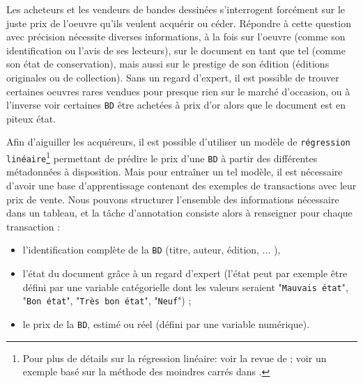 			Les acheteurs et les vendeurs de bandes dessinées s'interrogent forcément sur le juste prix de l'oeuvre qu'ils veulent acquérir ou céder.
			Répondre à cette question avec précision nécessite diverses informations, à la fois sur l'oeuvre (comme son identification ou l'avis de ses lecteurs), sur le document en tant que tel (comme son état de conservation), mais aussi sur le prestige de son édition (éditions originales ou de collection).
			Sans un regard d'expert, il est possible de trouver certaines oeuvres rares vendues pour presque rien sur le marché d'occasion, ou à l'inverse voir certaines \texttt{BD} être achetées à prix d'or alors que le document est en piteux état.
			
			Afin d'aiguiller les acquéreurs, il est possible d’utiliser un modèle de \texttt{régression linéaire}\footnote{Pour plus de détails sur la régression linéaire: voir la revue de \cite{maalouf:2011:logistic-regression-data} ; voir un exemple basé sur la méthode des moindres carrés dans \cite{zdaniuk:2014:ordinary-leastsquares-ols}.} permettant de prédire le prix d'une \texttt{BD} à partir des différentes métadonnées à disposition.
			Mais pour entraîner un tel modèle, il est nécessaire d'avoir une base d'apprentissage contenant des exemples de transactions avec leur prix de vente.
			Nous pouvons structurer l'ensemble des informations nécessaire dans un tableau, et la tâche d'annotation consiste alors à renseigner pour chaque transaction :
			\begin{itemize}
				\item l'identification complète de la \texttt{BD} (titre, auteur, édition, ... ),
				\item l'état du document grâce à un regard d'expert (l'état peut par exemple être défini par une variable catégorielle dont les valeurs seraient "\texttt{Mauvais état}", "\texttt{Bon état}", "\texttt{Très bon état}", "\texttt{Neuf}") ;
				\item le prix de la \texttt{BD}, estimé ou réel (défini par une variable numérique).
			\end{itemize}
			
